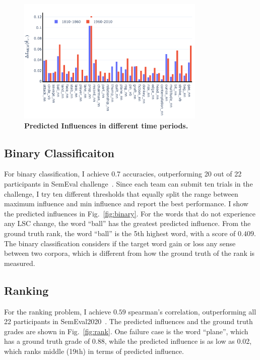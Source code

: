 \begin{figure}[t]
\centering
\includegraphics[width=0.8\textwidth]{../project/src/scale_5000-recursion_depth_10000/influences_by_corpus.pdf}
\caption{\textbf{Predicted Influences in different time periods.}}
\label{fig:inf_time}
\end{figure}

\subsection{Binary Classificaiton}

For binary classification, I achieve 0.7 accuracies, outperforming 20 out of 22 participants in SemEval challenge~\cite{semeval2020}.
Since each team can submit ten trials in the challenge, I try ten different thresholds that equally split the range between maximum influence and min influence and report the best performance.
I show the predicted influences in Fig.~\ref{fig:binary}.
For the words that do not experience any LSC change, the word ``ball'' has the greatest predicted influence. 
From the ground truth rank, the word ``ball'' is the 5th highest word, with a score of $0.409$.
The binary classification considers if the target word gain or loss any sense between two corpora, which is different from how the ground truth of the rank is measured.




\subsection{Ranking}


For the ranking problem, I achieve $0.59$ spearman's correlation, outperforming all 22 participants in SemEval2020~\cite{semeval2020}.
The predicted influences and the ground truth grades are shown in Fig.~\ref{fig:rank}.
One failure case is the word ``plane'', which has a ground truth grade of 0.88, while the predicted influence is as low as 0.02, which ranks middle (19th) in terms of predicted influence.



